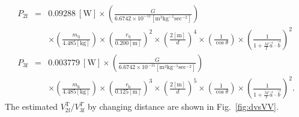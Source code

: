 \documentclass[A4]{spie}  %
\begin{document}
\begin{eqnarray}
P_{\mathrm{2f}}&=&0.09288 ~\mathrm{[W]}\times \left( \frac{G}{6.6742 \times 10^{-11} \mathrm{[m^3kg^{-1}sec^{-2}]}} \right) \nonumber \\
&& \times \left( \frac{m_{\mathrm{q}}}{4.485 \mathrm{[kg]}} \right) \times \left( \frac{r_{\mathrm{q}}}{0.200 \mathrm{[m]}} \right)^2 \times \left( \frac{2\mathrm{[m]}}{d} \right)^4 \times \left( \frac{1}{\cos{\theta}} \right) \times \left( \frac{1}{1+\frac{M}{I}\vec{a}\cdot \vec{b}} \right)^2\\
P_{\mathrm{3f}}&=&0.003779~\mathrm{[W]} \times \left( \frac{G}{6.6742 \times 10^{-11} \mathrm{[m^3kg^{-1}sec^{-2}]}} \right) \nonumber \\
&& \times \left( \frac{m_{\mathrm{h}}}{4.485 \mathrm{[kg]}} \right) \times \left( \frac{r_{\mathrm{h}}}{0.125 \mathrm{[m]}} \right)^3 \times \left( \frac{2\mathrm{[m]}}{d} \right)^5 \times \left( \frac{1}{\cos{\theta}} \right) \times \left( \frac{1}{1+\frac{M}{I}\vec{a}\cdot \vec{b}} \right)^2.
\end{eqnarray}
The estimated $V^{\mathrm{T}}_{\mathrm{2f}}/V^{T}_{\mathrm{3f}}$ by changing distance are shown in Fig.~\ref{fig:dvsVV}.
\end{document}
